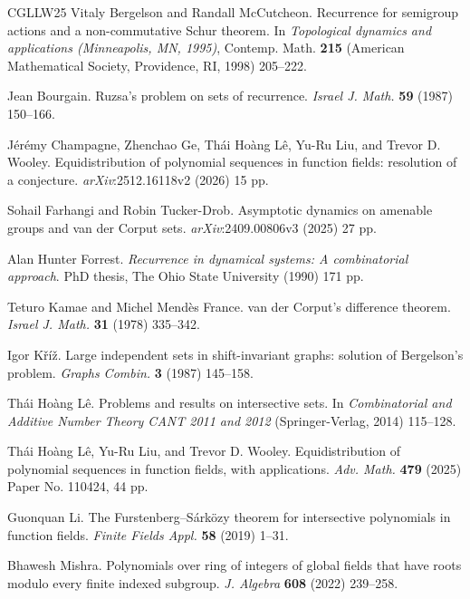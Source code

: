 \documentclass[11pt]{amsart}
\theoremstyle{theorem}
\theoremstyle{definition}
\begin{document}
\begin{thebibliography}{CGLLW25}
Vitaly Bergelson and Randall McCutcheon.
\newblock   Recurrence for semigroup actions and a non-commutative Schur theorem.
\newblock   In \emph{Topological dynamics and applications (Minneapolis, MN, 1995)}, Contemp. Math. \textbf{215} (American Mathematical Society, Providence, RI, 1998) 205--222.

Jean Bourgain.
\newblock   Ruzsa’s problem on sets of recurrence.
\newblock   \emph{Israel J. Math.} \textbf{59} (1987) 150--166.

J\'{e}r\'{e}my Champagne, Zhenchao Ge, Th\'{a}i Ho\`{a}ng L\^{e}, Yu-Ru Liu, and Trevor D. Wooley.
\newblock	Equidistribution of polynomial sequences in function fields: resolution of a conjecture.
\newblock	\emph{arXiv}:2512.16118v2 (2026) 15 pp.

Sohail Farhangi and Robin Tucker-Drob.
\newblock   Asymptotic dynamics on amenable groups and van der Corput sets.
\newblock   \emph{arXiv}:2409.00806v3 (2025) 27 pp.

Alan Hunter Forrest.
\newblock   \emph{Recurrence in dynamical systems: A combinatorial approach}.
\newblock   PhD thesis, The Ohio State University (1990) 171 pp.

Teturo Kamae and Michel Mend\`{e}s France.
\newblock   van der Corput's difference theorem.
\newblock   \emph{Israel J. Math.} \textbf{31} (1978) 335--342.

Igor K\v{r}\'{i}\v{z}.
\newblock   Large independent sets in shift-invariant graphs: solution of Bergelson’s problem.
\newblock   \emph{Graphs Combin.} \textbf{3} (1987) 145--158.

Th\'{a}i Ho\`{a}ng L\^{e}.
\newblock	Problems and results on intersective sets.
\newblock	In \emph{Combinatorial and Additive Number Theory CANT 2011 and 2012} (Springer-Verlag, 2014) 115--128.

Th\'{a}i Ho\`{a}ng L\^{e}, Yu-Ru Liu, and Trevor D. Wooley.
\newblock Equidistribution of polynomial sequences in function fields, with applications.
\newblock	\emph{Adv. Math.} \textbf{479} (2025) Paper No. 110424, 44 pp.

Guonquan Li.
\newblock	The Furstenberg--S\'{a}rk\"{o}zy theorem for intersective polynomials in function fields.
\newblock	\emph{Finite Fields Appl.} \textbf{58} (2019) 1--31.

Bhawesh Mishra.
\newblock	Polynomials over ring of integers of global fields that have roots modulo every finite indexed subgroup.
\newblock	\emph{J. Algebra} \textbf{608} (2022) 239--258.


\end{thebibliography}
\end{document}
